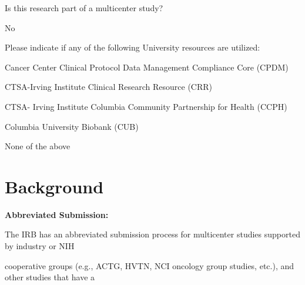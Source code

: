 \documentclass[10pt, letterpaper]{article}
\begin{document}
\vspace{0.5em}

\vspace{0.5em}

Is this research part of a multicenter study?

No

\vspace{0.5em}

\vspace{0.5em}

Please indicate if any of the following University resources are utilized:

\noindent \makebox[0pt][l]{$\square$}\hspace{1.2em} Cancer Center Clinical Protocol Data Management Compliance Core (CPDM)

\noindent \makebox[0pt][l]{$\square$}\hspace{1.2em} CTSA-Irving Institute Clinical Research Resource (CRR)

\noindent \makebox[0pt][l]{$\square$}\hspace{1.2em} CTSA- Irving Institute Columbia Community Partnership for Health (CCPH)

\noindent \makebox[0pt][l]{$\square$}\hspace{1.2em} Columbia University Biobank (CUB)

\noindent \makebox[0pt][l]{\color{columbiablue_official}$\boxtimes$}\hspace{1.2em} None of the above

\vspace{0.5em}

\vspace{0.5em}

\vspace{0.5em}

\section*{Background}

\vspace{0.5em}

\noindent \textbf{Abbreviated Submission:}

The IRB has an abbreviated submission process for multicenter studies supported by industry or NIH

cooperative groups (e.g., ACTG, HVTN, NCI oncology group studies, etc.), and other studies that have a

\vspace{0.5em}
\end{document}
